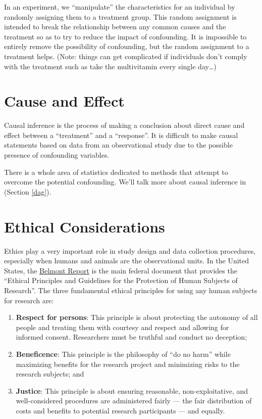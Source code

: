 \documentclass[
]{book}
\begin{document}
In an experiment, we ``manipulate'' the characteristics for an individual by randomly assigning them to a treatment group. This random assignment is intended to break the relationship between any common causes and the treatment so as to try to reduce the impact of confounding. It is impossible to entirely remove the possibility of confounding, but the random assignment to a treatment helps. (Note: things can get complicated if individuals don't comply with the treatment such as take the multivitamin every single day\ldots)

\hypertarget{cause-and-effect}{%
\section{Cause and Effect}\label{cause-and-effect}}

Causal inference is the process of making a conclusion about direct cause and effect between a ``treatment'' and a ``response''. It is difficult to make causal statements based on data from an observational study due to the possible presence of confounding variables.

There is a whole area of statistics dedicated to methods that attempt to overcome the potential confounding. We'll talk more about causal inference in (Section \ref{dag}).

\hypertarget{ethical-considerations}{%
\section{Ethical Considerations}\label{ethical-considerations}}

Ethics play a very important role in study design and data collection procedures, especially when humans and animals are the observational units. In the United States, the \href{https://www.hhs.gov/ohrp/regulations-and-policy/belmont-report/index.html}{Belmont Report} is the main federal document that provides the ``Ethical Principles and Guidelines for the Protection of Human Subjects of Research''. The three fundamental ethical principles for using any human subjects for research are:

\begin{enumerate}
\def\labelenumi{\arabic{enumi}.}
\item
  \textbf{Respect for persons}: This principle is about protecting the autonomy of all people and treating them with courtesy and respect and allowing for informed consent. Researchers must be truthful and conduct no deception;
\item
  \textbf{Beneficence}: This principle is the philosophy of ``do no harm'' while maximizing benefits for the research project and minimizing risks to the research subjects; and
\item
  \textbf{Justice}: This principle is about ensuring reasonable, non-exploitative, and well-considered procedures are administered fairly --- the fair distribution of costs and benefits to potential research participants --- and equally.
\end{enumerate}
\end{document}
